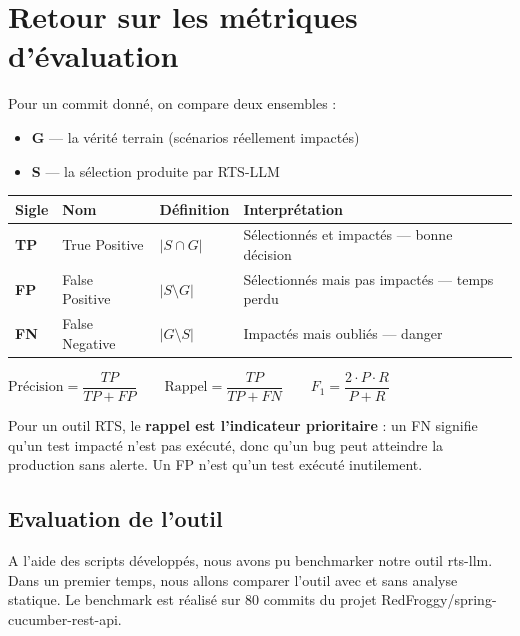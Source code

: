 \documentclass[12pt,a4paper]{article}
\begin{document}
\section{Retour sur les métriques d'évaluation}
\label{sec:metrics}

Pour un commit donné, on compare deux ensembles :
\begin{itemize}
  \item \textbf{G} --- la vérité terrain (scénarios réellement impactés)
  \item \textbf{S} --- la sélection produite par RTS-LLM
\end{itemize}

\begin{center}
\begin{tabularx}{\textwidth}{|l|l|l|X|}
\hline
\rowcolor{thbg}
\textbf{Sigle} & \textbf{Nom} & \textbf{Définition} & \textbf{Interprétation} \\
\hline
\textbf{TP} & True Positive  & $|S \cap G|$         & Sélectionnés et impactés --- bonne décision \\
\hline
\textbf{FP} & False Positive & $|S \setminus G|$    & Sélectionnés mais pas impactés --- temps perdu \\
\hline
\textbf{FN} & False Negative & $|G \setminus S|$    & Impactés mais oubliés --- \textcolor{warn}{danger} \\
\hline
\end{tabularx}
\end{center}

\begin{formulabox}
$\text{Précision} = \dfrac{TP}{TP + FP} \qquad
 \text{Rappel} = \dfrac{TP}{TP + FN} \qquad
 F_1 = \dfrac{2 \cdot P \cdot R}{P + R}$
\end{formulabox}

Pour un outil RTS, le \textbf{rappel est l'indicateur prioritaire} : un FN signifie qu'un test impacté n'est pas exécuté, donc qu'un bug peut atteindre la production sans alerte. Un FP n'est qu'un test exécuté inutilement.

\subsection{Evaluation de l'outil}
A l'aide des scripts développés, nous avons pu benchmarker notre outil rts-llm.
Dans un premier temps, nous allons comparer l'outil avec et sans analyse statique. Le benchmark est réalisé sur 80 commits du projet RedFroggy/spring-cucumber-rest-api.
\end{document}
